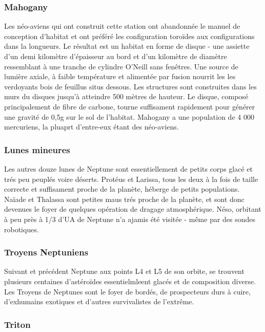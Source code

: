 \subsubsection{Mahogany} \label{sec:mahogany} 

Les néo-aviens qui ont construit cette station ont abandonnée le manuel de conception d'habitat et ont préféré les configuration toroïdes aux configurations dans la longueurs. Le résultat est un habitat en forme de disque - une assiette d'un demi kilomètre d'épaisseur au bord et d'un kilomètre de diamètre ressemblant à une tranche de cylindre O'Neill sans fenêtres. Une source de lumière axiale, à faible température et alimentée par fusion nourrit les les verdoyants bois de feuillus situs dessous. Les structures sont construites dans les murs du disques jusqu'à atteindre 500 mètres de hauteur. Le disque, composé principalement de fibre de carbone, tourne suffisament rapidement pour générer une gravité de 0,5g sur le sol de l'habitat. Mahogany a une population de 4 000 mercuriens, la pluaprt d'entre-eux étant des néo-aviens. 

\subsubsection{Lunes mineures} \label{sec:minor-moons} 

Les autres douze lunes de Neptune sont essentiellement de petits corps glacé et trés peu peuplés voire déserts. Protéus et Larissa, tous les deux à la fois de taille correcte et suffisament proche de la planète, héberge de petits populations. Naïade et Thalassa sont petites maus trés proche de la planète, et sont donc devenues le foyer de quelques opération de dragage atmosphérique. Néso, orbitant à peu près à 1/3 d'UA de Neptune n'a ajamis été visitée - même par des sondes robotiques. 

\subsubsection{Troyens Neptuniens} \label{sec:neptunian-trojans} 

Suivant et précédent Neptune aux points L4 et L5 de son orbite, se trouvent plusieurs centaines d'astéroïdes essentielmleent glacés et de composition diverse. Les Troyens de Neptunes sont le foyer de bordés, de prospecteurs durs à cuire, d'exhumains exotiques et d'autres survivalistes de l'extrême. 

\subsubsection{Triton} \label{sec:triton} 

